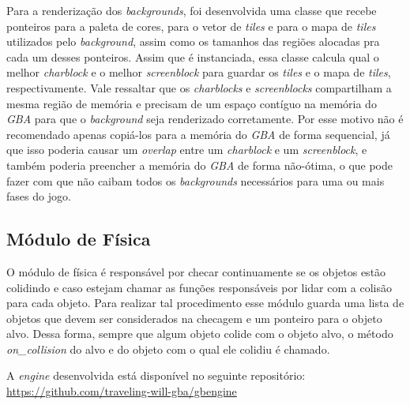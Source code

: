 Para a renderização dos \textit{backgrounds}, foi desenvolvida uma classe que recebe ponteiros para a paleta de cores,  para o vetor de \textit{tiles} e para o mapa de \textit{tiles} utilizados pelo \textit{background}, assim como os tamanhos das regiões alocadas pra cada um desses ponteiros. Assim que é instanciada, essa classe calcula qual o melhor \textit{charblock} e o melhor \textit{screenblock} para guardar os \textit{tiles} e o mapa de \textit{tiles}, respectivamente. Vale ressaltar que os \textit{charblocks} e \textit{screenblocks} compartilham a mesma região de memória e precisam de um espaço contíguo na memória do \textit{GBA} para que o \textit{background} seja renderizado corretamente. Por esse motivo não é recomendado apenas copiá-los para a memória do \textit{GBA} de forma sequencial, já que isso poderia causar um \textit{overlap} entre um \textit{charblock} e um \textit{screenblock}, e também poderia preencher a memória do \textit{GBA} de forma não-ótima, o que pode fazer com que não caibam todos os \textit{backgrounds} necessários para uma ou mais fases do jogo.

\subsection{Módulo de Física}

O módulo de física é responsável por checar continuamente se os objetos estão colidindo e caso estejam chamar as funções responsáveis por lidar com a colisão para cada objeto. Para realizar tal procedimento esse módulo guarda uma lista de objetos que devem ser considerados na checagem e um ponteiro para o objeto alvo. Dessa forma, sempre que algum objeto colide com o objeto alvo, o método \textit{on\_collision} do alvo e do objeto com o qual ele colidiu é chamado.


A \textit{engine} desenvolvida está disponível no seguinte repositório: \url{https://github.com/traveling-will-gba/gbengine}
